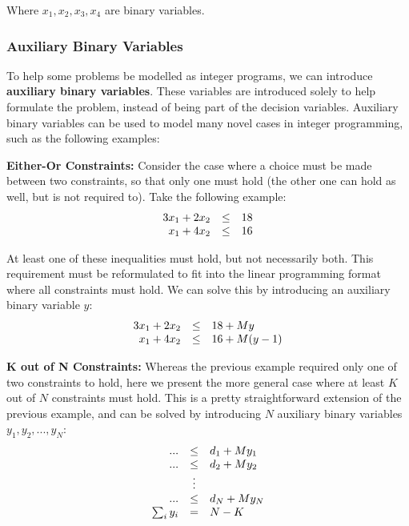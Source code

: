 \documentclass[12pt]{article}
\begin{document}
\noindent
Where $x_1, x_2, x_3, x_4$ are binary variables.

\subsubsection{Auxiliary Binary Variables}
To help some problems be modelled as integer programs, we can introduce \textbf{auxiliary binary variables}.
These variables are introduced solely to help formulate the problem, instead of being part of the decision variables.
Auxiliary binary variables can be used to model many novel cases in integer programming, such as the following examples:

\newpage
\noindent
\textbf{Either-Or Constraints:}
Consider the case where a choice must be made between two constraints, so that only one must hold (the other one can hold as well, but is not required to).
Take the following example:
\begin{align*}
    \begin{array}[t]{r c l}
        3x_1 + 2x_2 & \leq & 18 \\
        x_1 + 4x_2 & \leq & 16
     \end{array}
\end{align*}

\noindent
At least one of these inequalities must hold, but not necessarily both.
This requirement must be reformulated to fit into the linear programming format where all constraints must hold.
We can solve this by introducing an auxiliary binary variable $y$:
\begin{align*}
    \begin{array}[t]{r c l}
        3x_1 + 2x_2 & \leq & 18 + My \\
        x_1 + 4x_2 & \leq & 16 + M(y - 1)
     \end{array}
\end{align*}

\noindent
\textbf{K out of N Constraints:}
Whereas the previous example required only one of two constraints to hold, here we present the more general case where at least $K$ out of $N$ constraints must hold.
This is a pretty straightforward extension of the previous example, and can be solved by introducing $N$ auxiliary binary variables $y_1, y_2, ..., y_N$:
\begin{align*}
    \begin{array}[t]{r c l}
        ... & \leq & d_1 + My_1 \\
        ... & \leq & d_2 + My_2 \\
        & \vdots & \\
        ... & \leq & d_N + My_N \\
        \sum_i y_i & = & N - K
     \end{array}
\end{align*}
\end{document}
